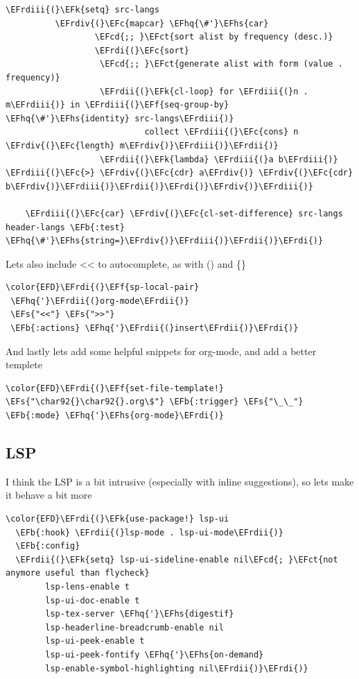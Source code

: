 \documentclass{scrartcl}
\newcommand{\EFk}[1]{\textcolor{EFk}{#1}} %
\newcommand{\EFs}[1]{\textcolor{EFs}{#1}} %
\newcommand{\EFb}[1]{\textcolor{EFb}{#1}} %
\newcommand{\EFct}[1]{\textcolor{EFct}{#1}} %
\newcommand{\EFc}[1]{\textcolor{EFc}{#1}} %
\newcommand{\EFf}[1]{\textcolor{EFf}{#1}} %
\newcommand{\EFcd}[1]{\textcolor{EFcd}{#1}} %
\newcommand{\EFhq}[1]{#1} %
\newcommand{\EFhs}[1]{#1} %
\newcommand{\EFrdi}[1]{#1} %
\newcommand{\EFrdii}[1]{#1} %
\newcommand{\EFrdiii}[1]{#1} %
\newcommand{\EFrdiv}[1]{#1} %
\begin{document}
\begin{Code}
\begin{Verbatim}[]
    \EFrdiii{(}\EFk{setq} src-langs
          \EFrdiv{(}\EFc{mapcar} \EFhq{\#'}\EFhs{car}
                  \EFcd{;; }\EFct{sort alist by frequency (desc.)}
                  \EFrdi{(}\EFc{sort}
                   \EFcd{;; }\EFct{generate alist with form (value . frequency)}
                   \EFrdii{(}\EFk{cl-loop} for \EFrdiii{(}n . m\EFrdiii{)} in \EFrdiii{(}\EFf{seq-group-by} \EFhq{\#'}\EFhs{identity} src-langs\EFrdiii{)}
                            collect \EFrdiii{(}\EFc{cons} n \EFrdiv{(}\EFc{length} m\EFrdiv{)}\EFrdiii{)}\EFrdii{)}
                   \EFrdii{(}\EFk{lambda} \EFrdiii{(}a b\EFrdiii{)} \EFrdiii{(}\EFc{>} \EFrdiv{(}\EFc{cdr} a\EFrdiv{)} \EFrdiv{(}\EFc{cdr} b\EFrdiv{)}\EFrdiii{)}\EFrdii{)}\EFrdi{)}\EFrdiv{)}\EFrdiii{)}

    \EFrdiii{(}\EFc{car} \EFrdiv{(}\EFc{cl-set-difference} src-langs header-langs \EFb{:test} \EFhq{\#'}\EFhs{string=}\EFrdiv{)}\EFrdiii{)}\EFrdii{)}\EFrdi{)}
\end{Verbatim}
\end{Code}

Lets also include << to autocomplete, as with () and \{\}
\begin{Code}
\begin{Verbatim}[]
\color{EFD}\EFrdi{(}\EFf{sp-local-pair}
 \EFhq{'}\EFrdii{(}org-mode\EFrdii{)}
 \EFs{"<<"} \EFs{">>"}
 \EFb{:actions} \EFhq{'}\EFrdii{(}insert\EFrdii{)}\EFrdi{)}
\end{Verbatim}
\end{Code}

And lastly lets add some helpful snippets for org-mode, and add a better templete
\begin{Code}
\begin{Verbatim}[]
\color{EFD}\EFrdi{(}\EFf{set-file-template!} \EFs{"\char92{}\char92{}.org\$"} \EFb{:trigger} \EFs{"\_\_"} \EFb{:mode} \EFhq{'}\EFhs{org-mode}\EFrdi{)}
\end{Verbatim}
\end{Code}

\subsection{LSP}
\label{sec:org8148860}
I think the LSP is a bit intrusive (especially with inline suggestions), so lets make it behave a bit more
\begin{Code}
\begin{Verbatim}[]
\color{EFD}\EFrdi{(}\EFk{use-package!} lsp-ui
  \EFb{:hook} \EFrdii{(}lsp-mode . lsp-ui-mode\EFrdii{)}
  \EFb{:config}
  \EFrdii{(}\EFk{setq} lsp-ui-sideline-enable nil\EFcd{; }\EFct{not anymore useful than flycheck}
        lsp-lens-enable t
        lsp-ui-doc-enable t
        lsp-tex-server \EFhq{'}\EFhs{digestif}
        lsp-headerline-breadcrumb-enable nil
        lsp-ui-peek-enable t
        lsp-ui-peek-fontify \EFhq{'}\EFhs{on-demand}
        lsp-enable-symbol-highlighting nil\EFrdii{)}\EFrdi{)}
\end{Verbatim}
\end{Code}
\end{document}
